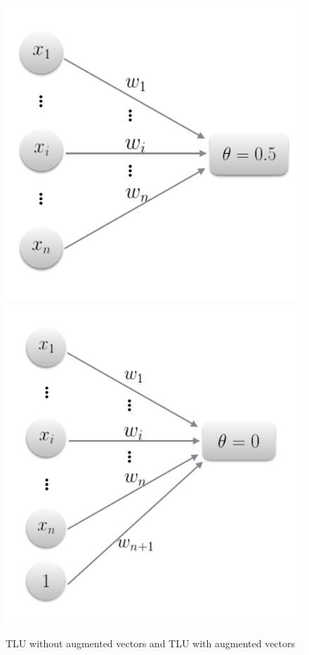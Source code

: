 \documentclass[paper=a4, fontsize=11pt]{scrartcl} %
\numberwithin{equation}{section} %
\numberwithin{figure}{section} %
\numberwithin{table}{section} %
\begin{document}
\begin{figure}[t]
    \includegraphics[scale=0.4]{image8.png}
    \hspace{\fill}
    \includegraphics[scale=0.4]{image9.png}
    \caption{TLU without augmented vectors and TLU with augmented vectors}
    \label{fig:Problem3.2}
\end{figure}
\end{document}
